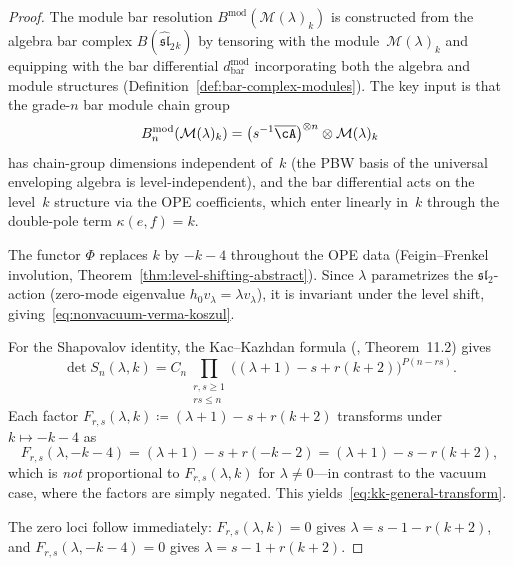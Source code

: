 \begin{proof}
The module bar resolution $B^\mathrm{mod}(\mathcal{M}(\lambda)_k)$
is constructed from the algebra bar complex
$B(\widehat{\mathfrak{sl}}_2{}_k)$ by tensoring with the
module~$\mathcal{M}(\lambda)_k$ and equipping with the bar
differential $d_{\mathrm{bar}}^{\mathrm{mod}}$ incorporating
both the algebra and module structures
(Definition~\ref{def:bar-complex-modules}).  The key input is
that the grade-$n$ bar module chain group
\[
B_n^{\mathrm{mod}}(\mathcal{M}(\lambda)_k) =
\bigl(s^{-1}\overline{\cA}\bigr)^{\otimes n}
\otimes \mathcal{M}(\lambda)_k
\]
has chain-group dimensions independent of~$k$ (the PBW basis of
the universal enveloping algebra is level-independent), and
the bar differential acts on the level~$k$ structure via the
OPE coefficients, which enter linearly in~$k$ through the
double-pole term $\kappa(e,f) = k$.

The functor $\Phi$ replaces $k$ by $-k-4$ throughout the OPE
data (Feigin--Frenkel involution,
Theorem~\ref{thm:level-shifting-abstract}).  Since $\lambda$
parametrizes the $\mathfrak{sl}_2$-action (zero-mode
eigenvalue $h_0 v_\lambda = \lambda v_\lambda$), it is
invariant under the level shift, giving~\eqref{eq:nonvacuum-verma-koszul}.

For the Shapovalov identity, the Kac--Kazhdan formula
(\cite{Kac}, Theorem~11.2) gives
\[
\det S_n(\lambda, k) = C_n
\prod_{\substack{r,s \geq 1 \\ rs \leq n}}
\bigl((\lambda+1) - s + r(k+2)\bigr)^{P(n-rs)}.
\]
Each factor $F_{r,s}(\lambda, k) \coloneqq (\lambda+1) - s + r(k+2)$
transforms under $k \mapsto -k-4$ as
\[
F_{r,s}(\lambda, -k\!-\!4) = (\lambda+1) - s + r(-k-2)
= (\lambda+1) - s - r(k+2),
\]
which is \emph{not} proportional to $F_{r,s}(\lambda, k)$
for $\lambda \neq 0$---in contrast to the vacuum case, where
the factors are simply negated.  This yields~\eqref{eq:kk-general-transform}.

The zero loci follow immediately:
$F_{r,s}(\lambda, k) = 0$ gives
$\lambda = s - 1 - r(k+2)$, and
$F_{r,s}(\lambda, -k\!-\!4) = 0$ gives
$\lambda = s - 1 + r(k+2)$.
\end{proof}


